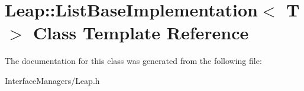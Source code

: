 \hypertarget{class_leap_1_1_list_base_implementation}{\section{Leap\+:\+:List\+Base\+Implementation$<$ T $>$ Class Template Reference}
\label{class_leap_1_1_list_base_implementation}
}


The documentation for this class was generated from the following file\+:\begin{DoxyCompactItemize}
\item 
Interface\+Managers/Leap.\+h\end{DoxyCompactItemize}
